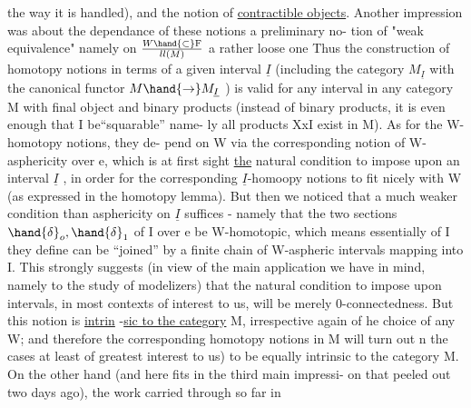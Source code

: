 the way it is handled),  and the notion of \uline{contractible objects}. Another
impression was about the dependance of these notions  a preliminary no-%
tion of "weak equivalence"  namely on $W\hand{\subset} \mathrm F\over{l}{l}(M)$  a rather loose one\hand{,}
Thus the construction of homotopy notions in terms of a given interval
$\underline{I}$ (including the category $M_{\underline{I}}$ with the canonical functor $M\hand{\to}M_{\underline{I}}$ ) is valid
for any interval in any category M with final object and binary products
(instead of binary products,  it is even enough that I be``squarable''\hand{,} name-%
ly all products XxI exist in M).  As for the W-homotopy notions,  they de-%
pend on W via the corresponding notion of W-asphericity over e,  which is
 at first sight \uline{the} natural condition to impose upon an interval $\underline{I}$ ,
in order for the corresponding $\underline{I}$-homoopy notions to fit nicely with W
(as expressed in the homotopy lemma).  But then we noticed that a much
weaker condition than asphericity on $\underline{I}$ suffices  -  namely that the two
sections $\hand{\delta}_o,\hand{\delta}_1$ of I over e be W-homotopic,  which means essentially  
 of I they define can be ``joined'' by a finite chain of
W-aspheric intervals mapping into I.  This strongly suggests (in view of
the main application we have in mind,  namely to the study of modelizers)
that the natural condition to impose upon intervals,  in most contexts of
interest to us,  will be merely 0-connectedness. But this notion is \uline{intrin}%
-\uline{sic to the category} M,  irrespective again of he choice of any W;  and
therefore the corresponding homotopy notions in M will turn out n the
cases at least of greatest interest to us)  to be equally intrinsic to the
category M.   On the other hand (and here fits in the third main impressi-%
on that peeled out two days ago),  the work carried through so far in
